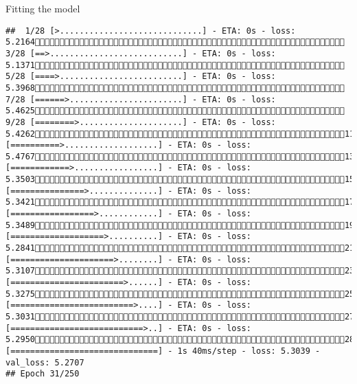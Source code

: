 \documentclass[
  ignorenonframetext,
]{beamer}
\begin{document}
\begin{frame}[fragile]{Fitting the model}
\begin{verbatim}
##  1/28 [>.............................] - ETA: 0s - loss: 5.2164 3/28 [==>...........................] - ETA: 0s - loss: 5.1371 5/28 [====>.........................] - ETA: 0s - loss: 5.3968 7/28 [======>.......................] - ETA: 0s - loss: 5.4625 9/28 [========>.....................] - ETA: 0s - loss: 5.426211/28 [==========>...................] - ETA: 0s - loss: 5.476713/28 [============>.................] - ETA: 0s - loss: 5.350315/28 [===============>..............] - ETA: 0s - loss: 5.342117/28 [=================>............] - ETA: 0s - loss: 5.348919/28 [===================>..........] - ETA: 0s - loss: 5.284121/28 [=====================>........] - ETA: 0s - loss: 5.310723/28 [=======================>......] - ETA: 0s - loss: 5.327525/28 [=========================>....] - ETA: 0s - loss: 5.303127/28 [===========================>..] - ETA: 0s - loss: 5.295028/28 [==============================] - 1s 40ms/step - loss: 5.3039 - val_loss: 5.2707
## Epoch 31/250

\end{verbatim}
\end{frame}
\end{document}
